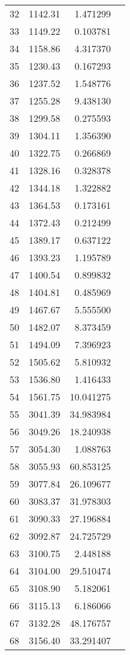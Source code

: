 \begin{tabular}{r|rr|l}
32 &     1142.31 &  1.471299  & \\
33 &     1149.22 &  0.103781  & \\
34 &     1158.86 &  4.317370  & \\
35 &     1230.43 &  0.167293  & \\
36 &     1237.52 &  1.548776  & \\
37 &     1255.28 &  9.438130  & \\
38 &     1299.58 &  0.275593  & \\
39 &     1304.11 &  1.356390  & \\
40 &     1322.75 &  0.266869  & \\
41 &     1328.16 &  0.328378  & \\
42 &     1344.18 &  1.322882  & \\
43 &     1364.53 &  0.173161  & \\
44 &     1372.43 &  0.212499  & \\
45 &     1389.17 &  0.637122  & \\
46 &     1393.23 &  1.195789  & \\
47 &     1400.54 &  0.899832  & \\
48 &     1404.81 &  0.485969  & \\
49 &     1467.67 &  5.555500  & \\
50 &     1482.07 &  8.373459  & \\
51 &     1494.09 &  7.396923  & \\
52 &     1505.62 &  5.810932  & \\
53 &     1536.80 &  1.416433  & \\
54 &     1561.75 & 10.041275  & \\
55 &     3041.39 & 34.983984  & \\
56 &     3049.26 & 18.240938  & \\
57 &     3054.30 &  1.088763  & \\
58 &     3055.93 & 60.853125  & \\
59 &     3077.84 & 26.109677  & \\
60 &     3083.37 & 31.978303  & \\
61 &     3090.33 & 27.196884  & \\
62 &     3092.87 & 24.725729  & \\
63 &     3100.75 &  2.448188  & \\
64 &     3104.00 &  29.510474  & \\
65 &     3108.90 &   5.182061  & \\
66 &     3115.13 &   6.186066  & \\
67 &     3132.28 &  48.176757  & \\
68 &     3156.40 &  33.291407  & \\
  \bottomrule
\end{tabular}
\normalsize

